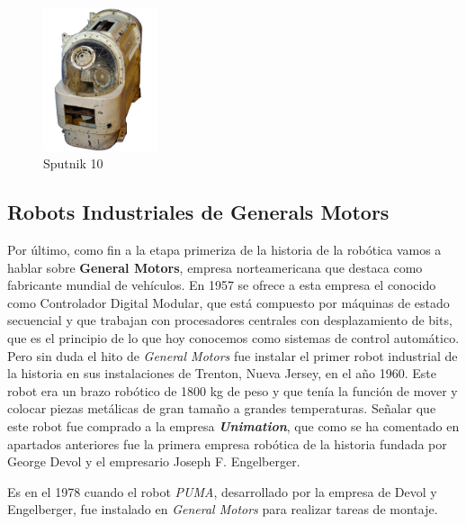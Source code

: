 \begin{figure}[H]
\begin{center}
  \includegraphics[width=0.3\textwidth]{./EtapaPrimeriza/imagenes/s10.jpg}
  \caption{Sputnik 10}
  \label{s2}
\end{center}
\end{figure}





\subsection{Robots Industriales de Generals Motors}


Por último, como fin a la etapa primeriza de la historia de la robótica vamos a hablar sobre \textbf{General Motors}, empresa norteamericana que destaca como fabricante mundial de vehículos. En 1957 se ofrece a esta empresa el conocido como Controlador Digital Modular, que está compuesto por máquinas de estado secuencial y que trabajan con procesadores centrales con desplazamiento de bits, que es el principio de lo que hoy conocemos como sistemas de control automático.\\


Pero sin duda el hito de \textit{General Motors} fue instalar el primer robot industrial de la historia en sus instalaciones de Trenton, Nueva Jersey, en el año 1960. Este robot era un brazo robótico de 1800 kg de peso y que tenía la función de mover y colocar piezas metálicas de gran tamaño a grandes temperaturas. Señalar que este robot fue comprado a la empresa \textit{\textbf{Unimation}}, que como se ha comentado en apartados anteriores fue la primera empresa robótica de la historia fundada por  George Devol y el empresario  Joseph F. Engelberger.

Es en el 1978 cuando el robot \textit{PUMA}, desarrollado por la empresa de Devol y Engelberger, fue instalado en \textit{General Motors} para realizar tareas de montaje.




